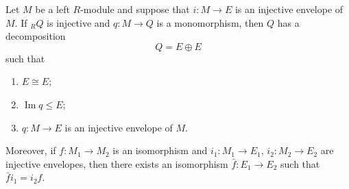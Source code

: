 Let $M$ be a left $R$-module and suppose that $i: M \to E$ is an injective envelope of $M$. If ${}_R Q$ is injective and $q: M \to Q$ is a monomorphism, then $Q$ has a decomposition
$$Q = E \oplus E$$
such that
\begin{enumerate}
\item[(1)] $E \cong E$;
\item[(2)] $\operatorname{Im} q \leq E$;
\item[(3)] $q: M \to E$ is an injective envelope of $M$.
\end{enumerate}
Moreover, if $f: M_1 \to M_2$ is an isomorphism and $i_1: M_1 \to E_1$, $i_2: M_2 \to E_2$ are injective envelopes, then there exists an isomorphism $\bar{f}: E_1 \to E_2$ such that $\bar{f} i_1 = i_2 f$.
